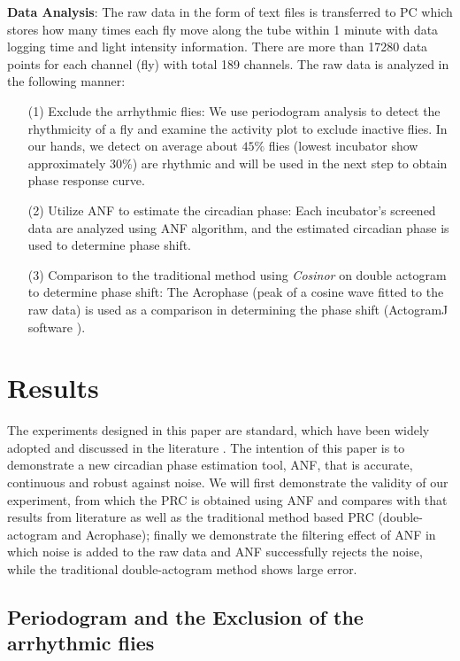 \documentclass[11pt, onecolumn]{IEEEtran}
\begin{document}
\medskip

\textbf{Data Analysis}: The raw data in the form of text files is transferred to PC which stores how many times each fly move along the tube within 1 minute with data logging time and light intensity information. There are more than 17280 data points for each channel (fly) with total 189 channels. The raw data is analyzed in the following manner:
\begin{itemize}
\item[(1)] Exclude the arrhythmic flies: We use periodogram analysis to detect the rhythmicity of a fly and examine the activity plot to exclude inactive flies. In our hands, we detect on average about $45\%$ flies (lowest incubator show approximately $30\%$) are rhythmic and will be used in the next step to obtain phase response curve.\\
\item[(2)] Utilize ANF to estimate the circadian phase: Each incubator's screened data are analyzed using ANF algorithm, and the estimated circadian phase is used to determine phase shift.\\
\item[(3)] Comparison to the traditional method using \emph{Cosinor} on double actogram to determine phase shift: The Acrophase (peak of a cosine wave fitted to the raw data) is used as a comparison in determining the phase shift (ActogramJ software \cite{ActoJ}). \\
\end{itemize}


\section{Results}\label{Result:Sec}
The experiments designed in this paper are standard, which have been widely adopted and discussed in the literature \cite{Klarsfeld03}. The intention of this paper is to demonstrate a new circadian phase estimation tool, ANF, that is accurate, continuous and robust against noise. We will first demonstrate the validity of our experiment, from which the PRC is obtained using ANF and compares with that results from literature as well as the traditional method based PRC (double-actogram and Acrophase); finally we demonstrate the filtering effect of ANF in which noise is added to the raw data and ANF successfully rejects the noise, while the traditional double-actogram method shows large error.

\subsection{Periodogram and the Exclusion of the arrhythmic flies}\label{SelectFly:Sec}
\end{document}
